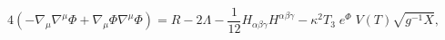\begin{equation}
4\left(-\nabla_\mu\nabla^\mu\Phi+\nabla_\mu\Phi\nabla^\mu\Phi\right) =
R -2\Lambda
-\frac{1}{12}H_{\alpha\beta\gamma}H^{\alpha\beta\gamma}
-\kappa^2T_3\;e^\Phi\;V(T)\sqrt{g^{-1}X},
\label{dilaton2}
\end{equation}

